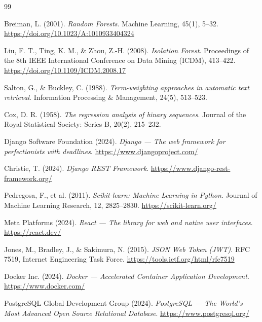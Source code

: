\documentclass[12pt,a4paper]{report}
\begin{document}
\begin{thebibliography}{99}

Breiman, L. (2001).
\textit{Random Forests}.
Machine Learning, 45(1), 5--32.
\url{https://doi.org/10.1023/A:1010933404324}

Liu, F. T., Ting, K. M., \& Zhou, Z.-H. (2008).
\textit{Isolation Forest}.
Proceedings of the 8th IEEE International Conference on Data Mining (ICDM), 413--422.
\url{https://doi.org/10.1109/ICDM.2008.17}

Salton, G., \& Buckley, C. (1988).
\textit{Term-weighting approaches in automatic text retrieval}.
Information Processing \& Management, 24(5), 513--523.

Cox, D. R. (1958).
\textit{The regression analysis of binary sequences}.
Journal of the Royal Statistical Society: Series B, 20(2), 215--232.

Django Software Foundation (2024).
\textit{Django — The web framework for perfectionists with deadlines}.
\url{https://www.djangoproject.com/}

Christie, T. (2024).
\textit{Django REST Framework}.
\url{https://www.django-rest-framework.org/}

Pedregosa, F., et al. (2011).
\textit{Scikit-learn: Machine Learning in Python}.
Journal of Machine Learning Research, 12, 2825--2830.
\url{https://scikit-learn.org/}

Meta Platforms (2024).
\textit{React — The library for web and native user interfaces}.
\url{https://react.dev/}

Jones, M., Bradley, J., \& Sakimura, N. (2015).
\textit{JSON Web Token (JWT)}.
RFC 7519, Internet Engineering Task Force.
\url{https://tools.ietf.org/html/rfc7519}

Docker Inc. (2024).
\textit{Docker — Accelerated Container Application Development}.
\url{https://www.docker.com/}

PostgreSQL Global Development Group (2024).
\textit{PostgreSQL — The World's Most Advanced Open Source Relational Database}.
\url{https://www.postgresql.org/}

\end{thebibliography}
\end{document}
